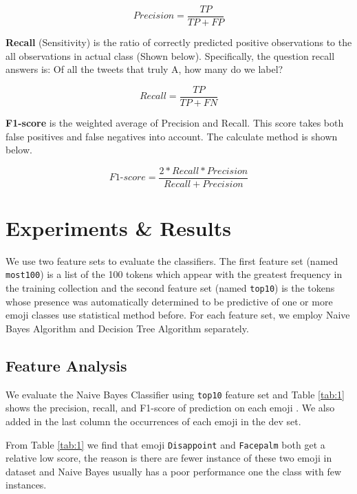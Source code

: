 \documentclass[11pt]{article}
\begin{document}
\begin{equation*}
Precision = \frac{TP}{TP + FP}
\end{equation*}

\noindent\textbf{Recall} (Sensitivity) is the ratio of correctly predicted positive observations to the all observations in actual class (Shown below). Specifically, the question recall answers is: Of all the tweets that truly A, how many do we label?

\begin{equation*}
Recall = \frac{TP}{TP + FN}
\end{equation*}

\noindent\textbf{F1-score} is the weighted average of Precision and Recall. This score takes both false positives and false negatives into account. The calculate method is shown below.

\begin{equation*}
F1\textrm{-}score = \frac{2*Recall*Precision}{Recall + Precision}
\end{equation*}


\section{Experiments \& Results}\label{lab:res}

We use two feature sets to evaluate the classifiers. The first feature set (named \texttt{most100}) is a list of the 100 tokens which appear with the greatest frequency in the training collection and the second feature set (named \texttt{top10}) is the tokens whose presence was automatically determined to be predictive of one or more emoji classes use statistical method before. For each feature set, we employ Naive Bayes Algorithm and Decision Tree Algorithm separately. 

\subsection{Feature Analysis}
We evaluate the Naive Bayes Classifier using \texttt{top10} feature set and Table \ref{tab:1} shows the precision, recall,  and F1-score  of prediction on each emoji . We also added in the last column the occurrences of each emoji in the dev set.

From Table \ref{tab:1} we find that emoji \texttt{Disappoint} and \texttt{Facepalm} both get a relative low score, the reason is there are fewer instance of these two emoji in dataset and Naive Bayes usually has a poor performance one the class with few instances. 
\end{document}
